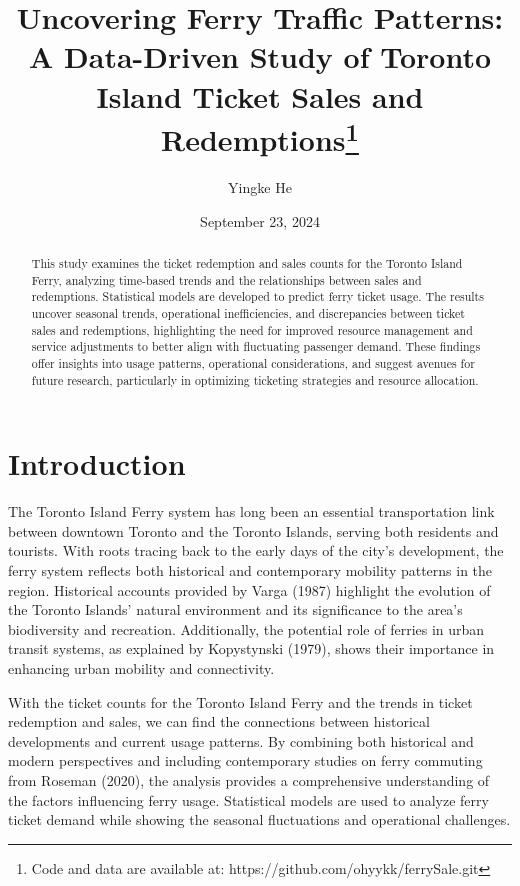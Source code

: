 \documentclass[
  letterpaper,
  DIV=11,
  numbers=noendperiod]{scrartcl}
\title{Uncovering Ferry Traffic Patterns: A Data-Driven Study of Toronto
Island Ticket Sales and Redemptions\thanks{Code and data are available
at: https://github.com/ohyykk/ferrySale.git}}
\author{Yingke He}
\date{September 23, 2024}
\renewcommand*\contentsname{Table of contents}
\newcommand\contentsname{Table of contents}
\begin{document}
\maketitle
\begin{abstract}
This study examines the ticket redemption and sales counts for the
Toronto Island Ferry, analyzing time-based trends and the relationships
between sales and redemptions. Statistical models are developed to
predict ferry ticket usage. The results uncover seasonal trends,
operational inefficiencies, and discrepancies between ticket sales and
redemptions, highlighting the need for improved resource management and
service adjustments to better align with fluctuating passenger demand.
These findings offer insights into usage patterns, operational
considerations, and suggest avenues for future research, particularly in
optimizing ticketing strategies and resource allocation.
\end{abstract}

\renewcommand*\contentsname{Table of contents}
{
\hypersetup{linkcolor=}
\setcounter{tocdepth}{3}
\tableofcontents
}

\section{Introduction}\label{introduction}

The Toronto Island Ferry system has long been an essential
transportation link between downtown Toronto and the Toronto Islands,
serving both residents and tourists. With roots tracing back to the
early days of the city's development, the ferry system reflects both
historical and contemporary mobility patterns in the region. Historical
accounts provided by Varga (1987) highlight the evolution of the Toronto
Islands' natural environment and its significance to the area's
biodiversity and recreation. Additionally, the potential role of ferries
in urban transit systems, as explained by Kopystynski (1979), shows
their importance in enhancing urban mobility and connectivity.

With the ticket counts for the Toronto Island Ferry and the trends in
ticket redemption and sales, we can find the connections between
historical developments and current usage patterns. By combining both
historical and modern perspectives and including contemporary studies on
ferry commuting from Roseman (2020), the analysis provides a
comprehensive understanding of the factors influencing ferry usage.
Statistical models are used to analyze ferry ticket demand while showing
the seasonal fluctuations and operational challenges.
\end{document}
